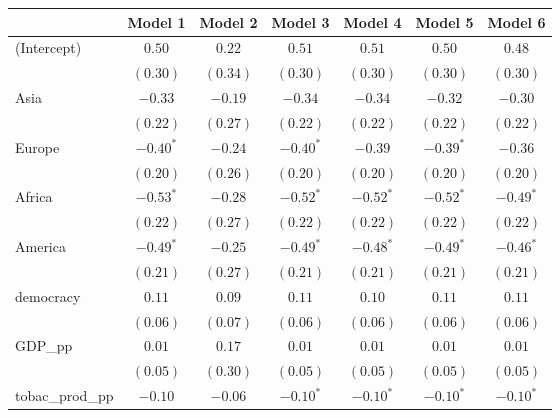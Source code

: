 
\begin{table}[!h]
\begin{center}
\begin{tabular}{l c c c c c c }
\toprule
 & Model 1 & Model 2 & Model 3 & Model 4 & Model 5 & Model 6 \\
\midrule
(Intercept)             & $0.50$       & $0.22$       & $0.51$       & $0.51$       & $0.50$       & $0.48$       \\
                        & $(0.30)$     & $(0.34)$     & $(0.30)$     & $(0.30)$     & $(0.30)$     & $(0.30)$     \\
Asia                    & $-0.33$      & $-0.19$      & $-0.34$      & $-0.34$      & $-0.32$      & $-0.30$      \\
                        & $(0.22)$     & $(0.27)$     & $(0.22)$     & $(0.22)$     & $(0.22)$     & $(0.22)$     \\
Europe                  & $-0.40^{*}$  & $-0.24$      & $-0.40^{*}$  & $-0.39$      & $-0.39^{*}$  & $-0.36$      \\
                        & $(0.20)$     & $(0.26)$     & $(0.20)$     & $(0.20)$     & $(0.20)$     & $(0.20)$     \\
Africa                  & $-0.53^{*}$  & $-0.28$      & $-0.52^{*}$  & $-0.52^{*}$  & $-0.52^{*}$  & $-0.49^{*}$  \\
                        & $(0.22)$     & $(0.27)$     & $(0.22)$     & $(0.22)$     & $(0.22)$     & $(0.22)$     \\
America                 & $-0.49^{*}$  & $-0.25$      & $-0.49^{*}$  & $-0.48^{*}$  & $-0.49^{*}$  & $-0.46^{*}$  \\
                        & $(0.21)$     & $(0.27)$     & $(0.21)$     & $(0.21)$     & $(0.21)$     & $(0.21)$     \\
democracy               & $0.11$       & $0.09$       & $0.11$       & $0.10$       & $0.11$       & $0.11$       \\
                        & $(0.06)$     & $(0.07)$     & $(0.06)$     & $(0.06)$     & $(0.06)$     & $(0.06)$     \\
GDP\_pp                 & $0.01$       & $0.17$       & $0.01$       & $0.01$       & $0.01$       & $0.01$       \\
                        & $(0.05)$     & $(0.30)$     & $(0.05)$     & $(0.05)$     & $(0.05)$     & $(0.05)$     \\
tobac\_prod\_pp         & $-0.10$      & $-0.06$      & $-0.10^{*}$  & $-0.10^{*}$  & $-0.10^{*}$  & $-0.10^{*}$  \\

\end{tabular}
\end{center}
\end{table}
